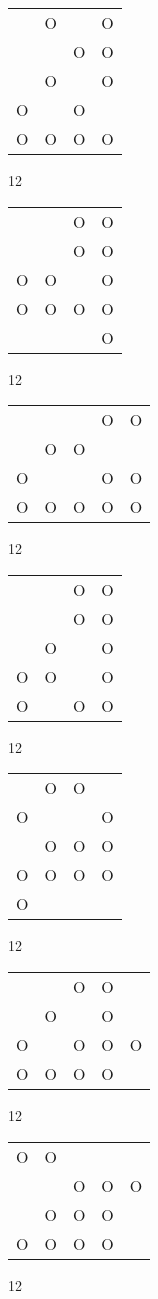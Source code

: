 \begin{tabular}{|m{0.2cm}m{0.2cm}m{0.2cm}m{0.2cm}|}\hline
 &O& &O\\
 & &O&O\\
 &O& &O\\
O& &O& \\
O&O&O&O\\
\hline\end{tabular}12
\begin{tabular}{|m{0.2cm}m{0.2cm}m{0.2cm}m{0.2cm}|}\hline
 & &O&O\\
 & &O&O\\
O&O& &O\\
O&O&O&O\\
 & & &O\\
\hline\end{tabular}12
\begin{tabular}{|m{0.2cm}m{0.2cm}m{0.2cm}m{0.2cm}m{0.2cm}|}\hline
 & & &O&O\\
 &O&O& & \\
O& & &O&O\\
O&O&O&O&O\\
\hline\end{tabular}12
\begin{tabular}{|m{0.2cm}m{0.2cm}m{0.2cm}m{0.2cm}|}\hline
 & &O&O\\
 & &O&O\\
 &O& &O\\
O&O& &O\\
O& &O&O\\
\hline\end{tabular}12
\begin{tabular}{|m{0.2cm}m{0.2cm}m{0.2cm}m{0.2cm}|}\hline
 &O&O& \\
O& & &O\\
 &O&O&O\\
O&O&O&O\\
O& & & \\
\hline\end{tabular}12
\begin{tabular}{|m{0.2cm}m{0.2cm}m{0.2cm}m{0.2cm}m{0.2cm}|}\hline
 & &O&O& \\
 &O& &O& \\
O& &O&O&O\\
O&O&O&O& \\
\hline\end{tabular}12
\begin{tabular}{|m{0.2cm}m{0.2cm}m{0.2cm}m{0.2cm}m{0.2cm}|}\hline
O&O& & & \\
 & &O&O&O\\
 &O&O&O& \\
O&O&O&O& \\
\hline\end{tabular}12
